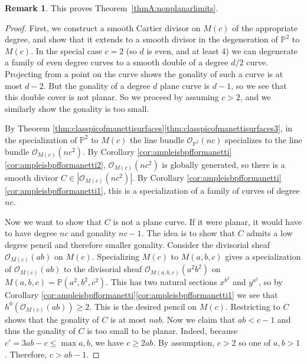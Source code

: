 \documentclass[11pt]{article}
\theoremstyle{plain}
\theoremstyle{definition}
\newtheorem{remark}[theorem]{Remark}
\newcommand\PP{{\mathbb{P}}}
\newcommand\Oc{{\mathcal O}}
\newcommand\Pabc{{\PP(a^2,b^2,c^2)}}
\begin{document}
\begin{remark}
This proves Theorem~\ref{thmA:nonplanarlimits}.
\end{remark}

\begin{proof}
First, we construct a smooth Cartier divisor on $M(c)$ of the appropriate degree, and show that it extends to a smooth divisor in the degeneration of $\PP^2$ to $M(c)$. In the special case $c=2$ (so $d$ is even, and at least 4) we can degenerate a family of even degree curves to a smooth double of a degree $d/2$ curve. Projecting from a point on the curve shows the gonality of such a curve is at most $d-2$. But the gonality of a degree $d$ plane curve is $d-1$, so we see that this double cover is not planar. So we proceed by assuming $c>2$, and we similarly show the gonality is too small.

By Theorem \ref{thm:classpicofmanettisurfaces}\eqref{thm:classpicofmanettisurfaces3}, in the specialization of $\PP^2$ to $M(c)$ the line bundle $\Oc_{\PP^2}(nc)$ specializes to the line bundle $\Oc_{M(c)}(nc^2)$. By Corollary \ref{cor:ampleisbpfformanetti}\eqref{cor:ampleisbpfformanetti2}, $\Oc_{M(c)}(nc^2)$ is globally generated, so there is a smooth divisor $C\in |\Oc_{M(c)}(nc^2)|$. By Corollary \ref{cor:ampleisbpfformanetti}\eqref{cor:ampleisbpfformanetti1}, this is a specialization of a family of curves of degree $nc$.

Now we want to show that $C$ is not a plane curve. If it were planar, it would have to have degree $nc$ and gonality $nc-1$. The idea is to show that $C$ admits a low degree pencil and therefore smaller gonality. Consider the divisorial sheaf $\Oc_{M(c)}(ab)$ on $M(c)$. Specializing $M(c)$ to $M(a,b,c)$ gives a specialization of $\Oc_{M(c)}(ab)$ to the divisorial sheaf $\Oc_{M(a,b,c)}(a^2b^2)$ on $M(a,b,c)=\Pabc$. This has two natural sections $x^{b^2}$ and $y^{a^2}$, so by Corollary \ref{cor:ampleisbpfformanetti}\eqref{cor:ampleisbpfformanetti1} we see that $h^0(\Oc_{M(c)}(ab))\ge 2$. This is the desired pencil on $M(c)$. Restricting to $C$ shows that the gonality of $C$ is at most $nab$. Now we claim that $ab< c-1$ and thus the gonality of $C$ is too small to be planar. Indeed, because $c' = 3ab - c \le \max{a,b}$, we have $c \ge 2ab$. By assumption, $c > 2$ so one of $a,b > 1$. Therefore, $c > ab -1$.
\end{proof}

\end{document}
